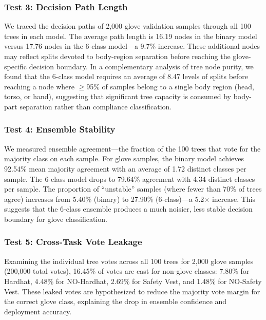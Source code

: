 \documentclass[11pt,a4paper]{article}
\begin{document}
\subsubsection{Test 3: Decision Path Length}
We traced the decision paths of 2,000 glove validation samples through all 100 trees in each model. The average path length is 16.19 nodes in the binary model versus 17.76 nodes in the 6-class model—a 9.7\% increase. These additional nodes may reflect splits devoted to body-region separation before reaching the glove-specific decision boundary. In a complementary analysis of tree node purity, we found that the 6-class model requires an average of 8.47 levels of splits before reaching a node where $\geq$95\% of samples belong to a single body region (head, torso, or hand), suggesting that significant tree capacity is consumed by body-part separation rather than compliance classification.

\subsubsection{Test 4: Ensemble Stability}
We measured ensemble agreement—the fraction of the 100 trees that vote for the majority class on each sample. For glove samples, the binary model achieves 92.54\% mean majority agreement with an average of 1.72 distinct classes per sample. The 6-class model drops to 79.64\% agreement with 4.34 distinct classes per sample. The proportion of ``unstable'' samples (where fewer than 70\% of trees agree) increases from 5.40\% (binary) to 27.90\% (6-class)—a 5.2$\times$ increase. This suggests that the 6-class ensemble produces a much noisier, less stable decision boundary for glove classification.

\subsubsection{Test 5: Cross-Task Vote Leakage}
Examining the individual tree votes across all 100 trees for 2,000 glove samples (200,000 total votes), 16.45\% of votes are cast for non-glove classes: 7.80\% for Hardhat, 4.48\% for NO-Hardhat, 2.69\% for Safety Vest, and 1.48\% for NO-Safety Vest. These leaked votes are hypothesized to reduce the majority vote margin for the correct glove class, explaining the drop in ensemble confidence and deployment accuracy.
\end{document}
